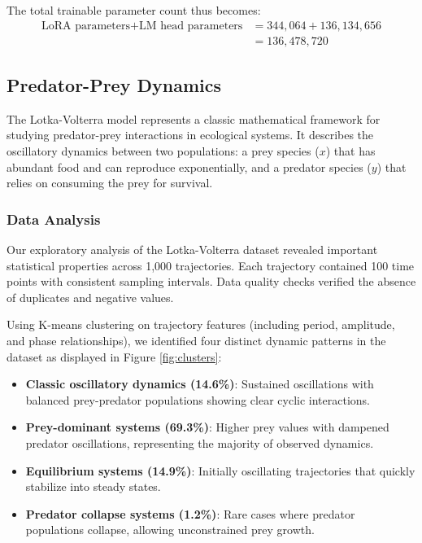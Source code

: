 \documentclass{article}
\begin{document}
The total trainable parameter count thus becomes:
\begin{align}
\text{LoRA parameters} + \text{LM head parameters} &= 344,064 + 136,134,656\\
&= 136,478,720
\end{align}

\subsection*{Predator-Prey Dynamics}

The Lotka-Volterra model represents a classic mathematical framework for studying predator-prey interactions in ecological systems. It describes the oscillatory dynamics between two populations: a prey species ($x$) that has abundant food and can reproduce exponentially, and a predator species ($y$) that relies on consuming the prey for survival.

\subsubsection*{Data Analysis}

Our exploratory analysis of the Lotka-Volterra dataset revealed important statistical properties across 1,000 trajectories. Each trajectory contained 100 time points with consistent sampling intervals. Data quality checks verified the absence of duplicates and negative values. 

Using K-means clustering on trajectory features (including period, amplitude, and phase relationships), we identified four distinct dynamic patterns in the dataset as displayed in Figure \ref{fig:clusters}:

\begin{itemize}
    \item \textbf{Classic oscillatory dynamics (14.6\%)}: Sustained oscillations with balanced prey-predator populations showing clear cyclic interactions.
    \item \textbf{Prey-dominant systems (69.3\%)}: Higher prey values with dampened predator oscillations, representing the majority of observed dynamics.
    \item \textbf{Equilibrium systems (14.9\%)}: Initially oscillating trajectories that quickly stabilize into steady states.
    \item \textbf{Predator collapse systems (1.2\%)}: Rare cases where predator populations collapse, allowing unconstrained prey growth.
    \end{itemize}
\end{document}
